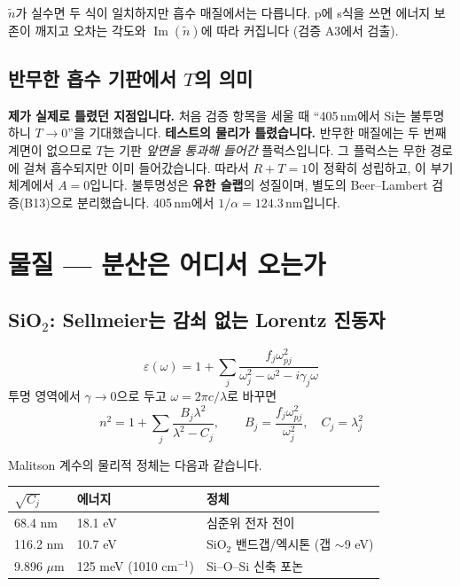 \documentclass[10pt,a4paper]{article}
\newcommand{\note}[1]{%
  \begin{tcolorbox}[enhanced,breakable,colback=white,colframe=accent,
    boxrule=0pt,leftrule=1.6pt,arc=0pt,outer arc=0pt,
    left=6pt,right=2pt,top=3pt,bottom=3pt,boxsep=0pt,
    before skip=5pt, after skip=8pt]
  #1
  \end{tcolorbox}}
\newcommand{\nt}{\tilde n}
\newcommand{\Imag}{\operatorname{Im}}
\begin{document}
$\nt$가 실수면 두 식이 일치하지만 흡수 매질에서는 다릅니다. p에 s식을 쓰면 에너지 보존이 깨지고 오차는 각도와 $\Imag(\nt)$에 따라 커집니다 (검증 A3에서 검출).

\subsection{\texorpdfstring{반무한 흡수 기판에서 $T$의 의미}{반무한 흡수 기판에서 T의 의미}}

\note{\textbf{제가 실제로 틀렸던 지점입니다.} 처음 검증 항목을 세울 때 ``405\,nm에서 Si는 불투명하니 $T\to0$''을 기대했습니다. \textbf{테스트의 물리가 틀렸습니다.} 반무한 매질에는 두 번째 계면이 없으므로 $T$는 기판 \emph{앞면을 통과해 들어간} 플럭스입니다. 그 플럭스는 무한 경로에 걸쳐 흡수되지만 이미 들어갔습니다. 따라서 $R+T=1$이 정확히 성립하고, 이 부기 체계에서 $A=0$입니다. 불투명성은 \textbf{유한 슬랩}의 성질이며, 별도의 Beer--Lambert 검증(B13)으로 분리했습니다. 405\,nm에서 $1/\alpha = 124.3$\,nm입니다.}

\section{물질 — 분산은 어디서 오는가}

\subsection{\texorpdfstring{SiO$_2$: Sellmeier는 감쇠 없는 Lorentz 진동자}{SiO2: Sellmeier는 감쇠 없는 Lorentz 진동자}}

\begin{equation}
\varepsilon(\omega) = 1+\sum_j\frac{f_j\omega_{pj}^2}{\omega_j^2-\omega^2-i\gamma_j\omega}
\end{equation}
투명 영역에서 $\gamma\to0$으로 두고 $\omega=2\pi c/\lambda$로 바꾸면
\begin{equation}
n^2 = 1+\sum_j\frac{B_j\lambda^2}{\lambda^2-C_j},\qquad
B_j=\frac{f_j\omega_{pj}^2}{\omega_j^2},\quad C_j=\lambda_j^2
\end{equation}

Malitson 계수의 물리적 정체는 다음과 같습니다.

\begin{center}
\begin{tabular}{@{}lll@{}}
\toprule
$\sqrt{C_j}$ & 에너지 & 정체 \\
\midrule
68.4 nm & 18.1 eV & 심준위 전자 전이 \\
116.2 nm & 10.7 eV & SiO$_2$ 밴드갭/엑시톤 (갭 $\sim$9 eV) \\
9.896 $\mu$m & 125 meV (1010 cm$^{-1}$) & Si--O--Si 신축 포논 \\
\bottomrule
\end{tabular}
\end{center}
\end{document}
